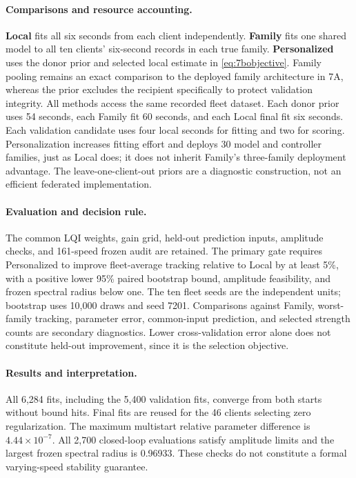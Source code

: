 \paragraph{Comparisons and resource accounting.}
\textbf{Local} fits all six seconds from each client independently.
\textbf{Family} fits one shared model to all ten clients' six-second records
in each true family. \textbf{Personalized} uses the donor prior and selected
local estimate in \cref{eq:7bobjective}. Family pooling remains an exact
comparison to the deployed family architecture in 7A, whereas the prior
excludes the recipient specifically to protect validation integrity.
All methods access the same recorded fleet dataset. Each donor prior uses
54 seconds, each Family fit 60 seconds, and each Local final fit six seconds.
Each validation candidate uses four local seconds for fitting and two for
scoring. Personalization increases fitting effort and deploys 30 model and
controller families, just as Local does; it does not inherit Family's
three-family deployment advantage. The leave-one-client-out priors are a
diagnostic construction, not an efficient federated implementation.

\paragraph{Evaluation and decision rule.}
The common LQI weights, gain grid, held-out prediction inputs, amplitude
checks, and 161-speed frozen audit are retained. The primary gate requires
Personalized to improve fleet-average tracking relative to Local by at least
5\%, with a positive lower 95\% paired bootstrap bound, amplitude feasibility,
and frozen spectral radius below one. The ten fleet seeds are the independent
units; bootstrap uses 10,000 draws and seed 7201. Comparisons against Family,
worst-family tracking, parameter error, common-input prediction, and selected
strength counts are secondary diagnostics. Lower cross-validation error alone
does not constitute held-out improvement, since it is the selection objective.

\paragraph{Results and interpretation.}
All 6,284 fits, including the 5,400 validation fits, converge from both starts
without bound hits. Final fits are reused for the 46 clients selecting zero
regularization. The maximum multistart relative parameter difference is
$4.44\times10^{-7}$. All 2,700 closed-loop evaluations satisfy amplitude
limits and the largest frozen spectral radius is 0.96933. These checks do not
constitute a formal varying-speed stability guarantee.

